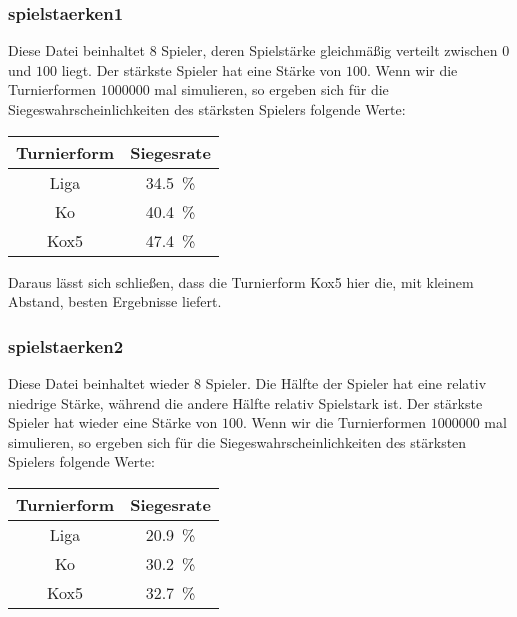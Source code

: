 \documentclass[a4paper, 12pt]{scrartcl}
\begin{document}
\subsubsection{spielstaerken1}

Diese Datei beinhaltet $8$ Spieler, deren Spielstärke gleichmäßig verteilt zwischen $0$ und $100$ liegt. Der stärkste Spieler hat eine Stärke von $100$.
Wenn wir die Turnierformen $1000000$ mal simulieren, so ergeben sich für die Siegeswahrscheinlichkeiten des stärksten Spielers folgende Werte:

\begin{table}[H]
    \centering
\begin{tabular}{@{}cc@{}}
\toprule
Turnierform & Siegesrate                \\ \midrule
    Liga        & \SI{34.5}{\percent}       \\
    Ko          & \SI{40.4}{\percent}       \\
    Kox5        & \SI{47.4}{\percent}       \\ \bottomrule
\end{tabular}
\end{table}

Daraus lässt sich schließen, dass die Turnierform Kox5 hier die, mit kleinem Abstand, besten Ergebnisse liefert.

\subsubsection{spielstaerken2}

Diese Datei beinhaltet wieder $8$ Spieler. Die Hälfte der Spieler hat eine relativ niedrige Stärke, während die andere Hälfte relativ Spielstark ist. Der stärkste Spieler hat wieder eine Stärke von $100$.
Wenn wir die Turnierformen $1000000$ mal simulieren, so ergeben sich für die Siegeswahrscheinlichkeiten des stärksten Spielers folgende Werte:

\begin{table}[H]
    \centering
\begin{tabular}{@{}cc@{}}
\toprule
Turnierform & Siegesrate                \\ \midrule
Liga        & \SI{20.9}{\percent}       \\
    Ko          & \SI{30.2}{\percent}       \\
    Kox5        & \SI{32.7}{\percent}       \\ \bottomrule
\end{tabular}
\end{table}
\end{document}
